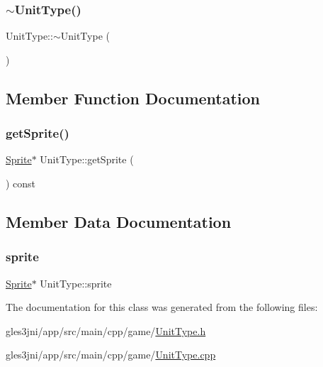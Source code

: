 \mbox{\label{class_unit_type_a0b72d6463ffb729f9cf8b6b5cb3688b0}} 
\subsubsection{\texorpdfstring{$\sim$\+Unit\+Type()}{~UnitType()}}
{\footnotesize\ttfamily Unit\+Type\+::$\sim$\+Unit\+Type (\begin{DoxyParamCaption}{ }\end{DoxyParamCaption})}



\subsection{Member Function Documentation}
\mbox{\label{class_unit_type_aa4fb91abbe5f1982764c447251e31cf8}} 
\subsubsection{\texorpdfstring{get\+Sprite()}{getSprite()}}
{\footnotesize\ttfamily \hyperlink{class_sprite}{Sprite}$\ast$ Unit\+Type\+::get\+Sprite (\begin{DoxyParamCaption}{ }\end{DoxyParamCaption}) const\hspace{0.3cm}{\ttfamily [inline]}}



\subsection{Member Data Documentation}
\mbox{\label{class_unit_type_a6e361b921f79f39f082a761feb271ba1}} 
\subsubsection{\texorpdfstring{sprite}{sprite}}
{\footnotesize\ttfamily \hyperlink{class_sprite}{Sprite}$\ast$ Unit\+Type\+::sprite\hspace{0.3cm}{\ttfamily [private]}}



The documentation for this class was generated from the following files\+:\begin{DoxyCompactItemize}
\item 
gles3jni/app/src/main/cpp/game/\hyperlink{_unit_type_8h}{Unit\+Type.\+h}\item 
gles3jni/app/src/main/cpp/game/\hyperlink{_unit_type_8cpp}{Unit\+Type.\+cpp}\end{DoxyCompactItemize}
